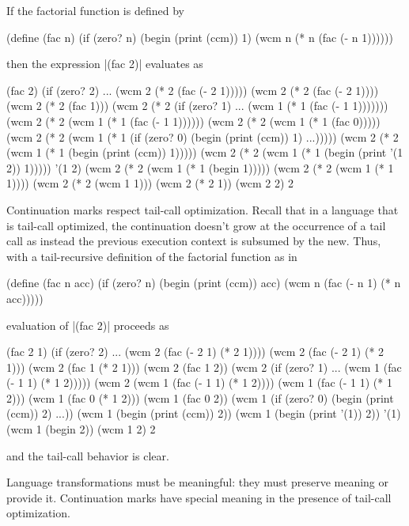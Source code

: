 \documentclass{llncs}
\begin{document}
If the factorial function is defined by
\begin{schemedisplay}
(define (fac n)
  (if (zero? n)
      (begin
        (print (ccm))
        1)
      (wcm n (* n (fac (- n 1))))))
\end{schemedisplay}
then the expression \scheme|(fac 2)| evaluates as
\begin{schemedisplay}
(fac 2)
(if (zero? 2) ... (wcm 2 (* 2 (fac (- 2 1)))))
(wcm 2 (* 2 (fac (- 2 1))))
(wcm 2 (* 2 (fac 1)))
(wcm 2 (* 2 (if (zero? 1) ... (wcm 1 (* 1 (fac (- 1 1)))))))
(wcm 2 (* 2 (wcm 1 (* 1 (fac (- 1 1))))))
(wcm 2 (* 2 (wcm 1 (* 1 (fac 0)))))
(wcm 2 (* 2 (wcm 1 (* 1 (if (zero? 0) (begin (print (ccm)) 1) ...)))))
(wcm 2 (* 2 (wcm 1 (* 1 (begin (print (ccm)) 1)))))
(wcm 2 (* 2 (wcm 1 (* 1 (begin (print '(1 2)) 1)))))
'(1 2)
(wcm 2 (* 2 (wcm 1 (* 1 (begin 1)))))
(wcm 2 (* 2 (wcm 1 (* 1 1))))
(wcm 2 (* 2 (wcm 1 1)))
(wcm 2 (* 2 1))
(wcm 2 2)
2
\end{schemedisplay}

Continuation marks respect tail-call optimization. Recall that in a language that is tail-call optimized, the continuation doesn't grow at the occurrence of a tail call as instead the previous execution context is subsumed by the new. Thus, with a tail-recursive definition of the factorial function as in
\begin{schemedisplay}
(define (fac n acc)
  (if (zero? n)
      (begin
        (print (ccm))
        acc)
      (wcm n (fac (- n 1) (* n acc)))))
\end{schemedisplay}
evaluation of \scheme|(fac 2)| proceeds as
\begin{schemedisplay}
(fac 2 1)
(if (zero? 2) ... (wcm 2 (fac (- 2 1) (* 2 1))))
(wcm 2 (fac (- 2 1) (* 2 1)))
(wcm 2 (fac 1 (* 2 1)))
(wcm 2 (fac 1 2))
(wcm 2 (if (zero? 1) ... (wcm 1 (fac (- 1 1) (* 1 2)))))
(wcm 2 (wcm 1 (fac (- 1 1) (* 1 2))))
(wcm 1 (fac (- 1 1) (* 1 2)))
(wcm 1 (fac 0 (* 1 2)))
(wcm 1 (fac 0 2))
(wcm 1 (if (zero? 0) (begin (print (ccm)) 2) ...))
(wcm 1 (begin (print (ccm)) 2))
(wcm 1 (begin (print '(1)) 2))
'(1)
(wcm 1 (begin 2))
(wcm 1 2)
2
\end{schemedisplay}
and the tail-call behavior is clear.

Language transformations must be meaningful: they must preserve meaning or provide it. Continuation marks have special meaning in the presence of tail-call optimization.
\end{document}

